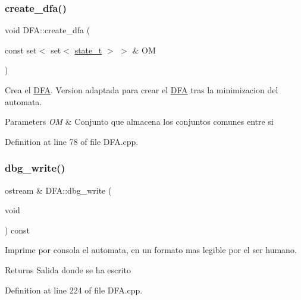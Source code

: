 \subsubsection{\texorpdfstring{create\+\_\+dfa()}{create\_dfa()}\hspace{0.1cm}{\footnotesize\ttfamily [2/2]}}
{\footnotesize\ttfamily void D\+F\+A\+::create\+\_\+dfa (\begin{DoxyParamCaption}\item[{const set$<$ set$<$ \hyperlink{classstate__t}{state\+\_\+t} $>$ $>$ \&}]{OM }\end{DoxyParamCaption})}



Crea el \hyperlink{class_d_f_a}{D\+FA}. Version adaptada para crear el \hyperlink{class_d_f_a}{D\+FA} tras la minimizacion del automata. 


\begin{DoxyParams}{Parameters}
{\em OM} & Conjunto que almacena los conjuntos comunes entre si \\
\hline
\end{DoxyParams}


Definition at line 78 of file D\+F\+A.\+cpp.

\mbox{\label{class_d_f_a_ac7f9b36f9c298f1dfd53c4bdf395c1d5}} 
\subsubsection{\texorpdfstring{dbg\+\_\+write()}{dbg\_write()}}
{\footnotesize\ttfamily ostream \& D\+F\+A\+::dbg\+\_\+write (\begin{DoxyParamCaption}\item[{void}]{ }\end{DoxyParamCaption}) const}



Imprime por consola el automata, en un formato mas legible por el ser humano. 

\begin{DoxyReturn}{Returns}
Salida donde se ha escrito 
\end{DoxyReturn}


Definition at line 224 of file D\+F\+A.\+cpp.

\mbox{\label{class_d_f_a_a165a6e75da0c003a78ddf437ef26169e}} 
